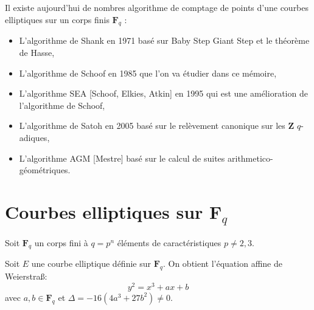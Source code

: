 \documentclass[french, lmodern]{beamer}
\newcommand\fq{\mathbf{F}_{q}}
\begin{document}
\begin{frame}
\transwipe
Il existe aujourd'hui de nombres algorithme de comptage de points d'une courbes elliptiques sur un corps finis $\fq$ :\begin{itemize}
\item L'algorithme de Shank en 1971 basé sur Baby Step Giant Step et le théorème de Hasse,
\pause
\item L'algorithme de Schoof en 1985 que l'on va étudier dans ce mémoire,
\pause
\item L'algorithme SEA [Schoof, Elkies, Atkin] en 1995 qui est une amélioration de l'algorithme de Schoof,
\pause
\item L'algorithme de Satoh en 2005 basé sur le relèvement canonique sur les $\mathbf{Z}$ $q$-adiques,
\pause
\item L'algorithme AGM [Mestre] basé sur le calcul de suites arithmetico-géométriques.
\end{itemize}
\end{frame}

\section{Courbes elliptiques sur $\fq$}

\begin{frame}
\transwipe
Soit $\fq$ un corps fini à $q=p^{n}$ éléments de caractéristiques $p\neq 2,3$.
\begin{definition}
Soit $E$ une courbe elliptique définie sur $\fq$. On obtient l'équation affine de Weierstra\ss : 
\begin{equation}
y^{2} = x^{3} + ax + b
\label{ecc}
\end{equation} 
avec $a,b\in\fq$ et $\Delta = -16(4a^{3} + 27b^{2}) \neq 0$.
\end{definition}
\end{frame}

\end{document}
